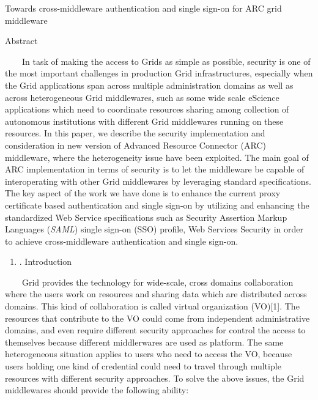 \documentclass{article}
\title{}
\newcommand\liststyleLi{%
\renewcommand\theenumi{\arabic{enumi}}
\renewcommand\theenumii{\arabic{enumii}}
\renewcommand\theenumiii{\arabic{enumiii}}
\renewcommand\theenumiv{\arabic{enumiv}}
\renewcommand\labelenumi{\theenumi.}
\renewcommand\labelenumii{\theenumii.}
\renewcommand\labelenumiii{\theenumiii.}
\renewcommand\labelenumiv{\theenumiv.}
}
\begin{document}
{\centering
Towards cross-middleware authentication and single sign-on for ARC grid
middleware
\par}


\bigskip

{\centering
Abstract
\par}

\ \ \ \ In task of making the access to Grids as simple as possible,
security is one of the most important challenges in production Grid
infrastructures, especially when the Grid applications span across
multiple administration domains as well as across heterogeneous Grid
middlewares, such as some wide scale eScience applications which need
to coordinate resources sharing among collection of autonomous
institutions with different Grid middlewares running on these
resources. In this paper, we describe the security implementation and
consideration in new version of Advanced Resource Connector (ARC)
middleware, where the heterogeneity issue have been exploited. The main
goal of ARC implementation in terms of security is to let the
middleware be capable of interoperating with other Grid middlewares by
leveraging standard specifications. The key aspect of the work we have
done is to enhance the current proxy certificate based authentication
and single sign-on by utilizing and enhancing the standardized Web
Service specifications such as Security Assertion Markup Languages
(\textit{SAML}) single sign-on (SSO) profile, Web Services Security in
order to achieve cross-middleware authentication and single sign-on.


\bigskip

\liststyleLi
\begin{enumerate}
\item[] {. Introduction
\par}
\end{enumerate}
\ \ \ \ Grid provides the technology for wide-scale, cross domains
collaboration where the users work on resources and sharing data which
are distributed across domains. This kind of collaboration is called
virtual organization (VO)[1]. The resources that contribute to the VO
could come from independent administrative domains, and even require
different security approaches for control the access to themselves
because different middlerwares are used as platform. The same
heterogeneous situation applies to users who need to access the VO,
because users holding one kind of credential could need to travel
through multiple resources with different security approaches. To solve
the above issues, the Grid middlewares should provide the following
ability: 
\end{document}
